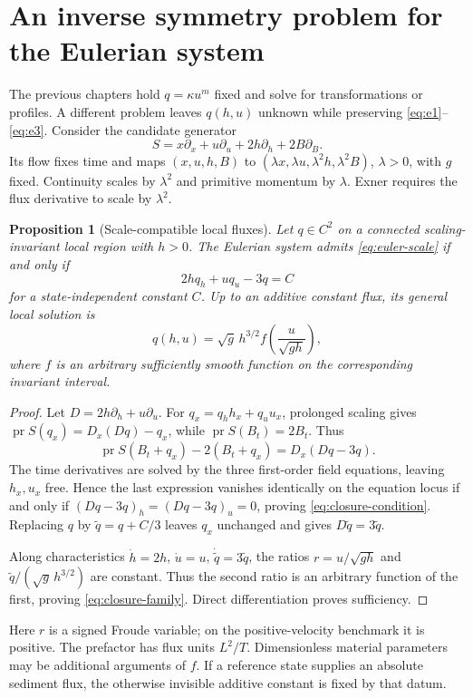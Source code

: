 \documentclass[11pt,a4paper,oneside]{report}
\numberwithin{equation}{chapter}
\newtheorem{proposition}[theorem]{Proposition}
\newcommand{\pr}{\operatorname{pr}}
\begin{document}
\section{An inverse symmetry problem for the Eulerian system}
The previous chapters hold $q=\kappa u^m$ fixed and solve for transformations or profiles. A different problem leaves $q(h,u)$ unknown while preserving \eqref{eq:e1}--\eqref{eq:e3}. Consider the candidate generator
\begin{equation}\label{eq:euler-scale}
S=x\partial_x+u\partial_u+2h\partial_h+2B\partial_B.
\end{equation}
Its flow fixes time and maps $(x,u,h,B)$ to $(\lambda x,\lambda u,\lambda^2h,\lambda^2B)$, $\lambda>0$, with $g$ fixed. Continuity scales by $\lambda^2$ and primitive momentum by $\lambda$. Exner requires the flux derivative to scale by $\lambda^2$.

\begin{proposition}[Scale-compatible local fluxes]\label{prop:closure}
Let $q\in C^2$ on a connected scaling-invariant local region with $h>0$. The Eulerian system admits \eqref{eq:euler-scale} if and only if
\begin{equation}\label{eq:closure-condition}
2h q_h+u q_u-3q=C
\end{equation}
for a state-independent constant $C$. Up to an additive constant flux, its general local solution is
\begin{equation}\label{eq:closure-family}
q(h,u)=\sqrt g\,h^{3/2} f\!\left(\frac{u}{\sqrt{gh}}\right),
\end{equation}
where $f$ is an arbitrary sufficiently smooth function on the corresponding invariant interval.
\end{proposition}
\begin{proof}
Let $D=2h\partial_h+u\partial_u$. For $q_x=q_hh_x+q_uu_x$, prolonged scaling gives $\pr S(q_x)=D_x(Dq)-q_x$, while $\pr S(B_t)=2B_t$. Thus
\begin{equation}
\pr S(B_t+q_x)-2(B_t+q_x)=D_x(Dq-3q).
\end{equation}
The time derivatives are solved by the three first-order field equations, leaving $h_x,u_x$ free. Hence the last expression vanishes identically on the equation locus if and only if $(Dq-3q)_h=(Dq-3q)_u=0$, proving \eqref{eq:closure-condition}. Replacing $q$ by $\widetilde q=q+C/3$ leaves $q_x$ unchanged and gives $D\widetilde q=3\widetilde q$.

Along characteristics $\dot h=2h$, $\dot u=u$, $\dot{\widetilde q}=3\widetilde q$, the ratios $r=u/\sqrt{gh}$ and $\widetilde q/(\sqrt g\,h^{3/2})$ are constant. Thus the second ratio is an arbitrary function of the first, proving \eqref{eq:closure-family}. Direct differentiation proves sufficiency.\end{proof}
Here $r$ is a signed Froude variable; on the positive-velocity benchmark it is positive. The prefactor has flux units $L^2/T$. Dimensionless material parameters may be additional arguments of $f$. If a reference state supplies an absolute sediment flux, the otherwise invisible additive constant is fixed by that datum.
\end{document}
